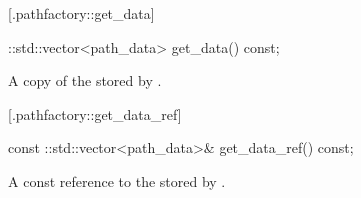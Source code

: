 [\iotwod.pathfactory::get_data] {}

%
%
\begin{itemdecl}
::std::vector<path_data> get_data() const;
\end{itemdecl}
\begin{itemdescr}
	\pnum
	\returns
	A copy of the  stored by .
\end{itemdescr}

 [\iotwod.pathfactory::get_data_ref] {}

%
%
\begin{itemdecl}
const ::std::vector<path_data>& get_data_ref() const;
\end{itemdecl}
\begin{itemdescr}
	\pnum
	\returns
	A const reference to the  stored by .
\end{itemdescr}
